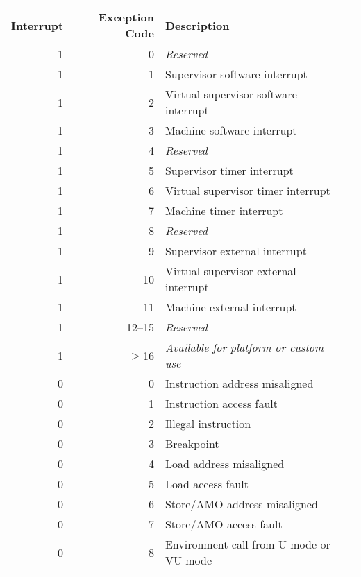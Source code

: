 \begin{table*}[p]
\begin{center}
\begin{tabular}{|r|r|l|l|}
  \hline
  Interrupt & Exception Code  & Description \\
  \hline
  1         & 0               & {\em Reserved} \\
  1         & 1               & Supervisor software interrupt \\
  1         & 2               & Virtual supervisor software interrupt \\
  1         & 3               & Machine software interrupt \\ \hline
  1         & 4               & {\em Reserved} \\
  1         & 5               & Supervisor timer interrupt \\
  1         & 6               & Virtual supervisor timer interrupt \\
  1         & 7               & Machine timer interrupt \\ \hline
  1         & 8               & {\em Reserved} \\
  1         & 9               & Supervisor external interrupt \\
  1         & 10              & Virtual supervisor external interrupt \\
  1         & 11              & Machine external interrupt \\ \hline
  1         & 12--15          & {\em Reserved} \\
  1         & $\ge$16         & {\em Available for platform or custom use} \\ \hline
  0         & 0               & Instruction address misaligned \\
  0         & 1               & Instruction access fault \\
  0         & 2               & Illegal instruction \\
  0         & 3               & Breakpoint \\
  0         & 4               & Load address misaligned \\
  0         & 5               & Load access fault \\
  0         & 6               & Store/AMO address misaligned \\
  0         & 7               & Store/AMO access fault \\
  0         & 8               & Environment call from U-mode or VU-mode \\

\end{tabular}
\end{center}
\end{table*}
